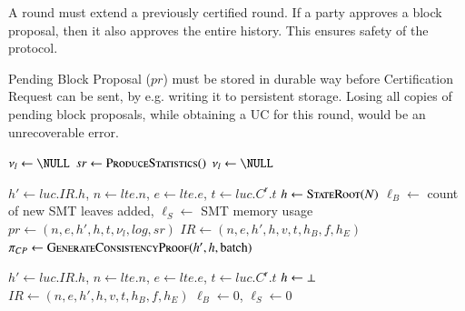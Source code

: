 A round must extend a previously certified round. If a party approves a block proposal, then it also approves the entire history. This ensures safety of the protocol.

Pending Block Proposal ($pr$) must be stored in durable way before Certification Request can be sent, by e.g. writing it to persistent storage. Losing all copies of pending block proposals, while obtaining a UC for this round, would be an unrecoverable error.

\begin{algorithm}
  \caption{Producing a Block Proposal}\label{alg:proposal}
  \begin{algorithmic}[0]
                      
        \State $\nu_l \gets \NULL$
        \State {}  
        \State $sr \gets \Call{ProduceStatistics}{\null}$
        \State {} 
        \State {}
      \EndIf
      \State $\nu_l \gets \NULL$          
    \EndEvent
  \end{algorithmic}
\end{algorithm}

\begin{algorithm}
  \caption{Producing a Certification Request}\label{alg:ucrequest}
  \begin{algorithmic}[0]
      \State $h' \gets luc.IR.h$, $n \gets lte.n$, $e \gets lte.e$, $t \gets luc.C^\mathsf{r}.t$
      \State $h \gets \Call{StateRoot}{N}$
      \State $\ell_B \gets$ count of new SMT leaves added, $\ell_S \gets$ SMT memory usage
      \State $pr \gets (n, e, h', h, t, \nu_l, log, sr)$  
        \State $IR \gets (n, e, h', h, v, t, h_B, f, h_E)$
        \State $\pi_{CP} \gets \Call{GenerateConsistencyProof}{h', h, \text{batch}}$ 
        \State {}
      \Else
        \State {}
        \State {}
      \EndIf
    \EndFunction

      
      \State $h' \gets luc.IR.h$, $n \gets lte.n$, $e \gets lte.e$, $t \gets luc.C^\mathsf{r}.t$
      \State $h \gets \bot$
      \State $IR \gets (n, e, h', h, v, t, h_B, f, h_E)$
      \State $\ell_B \gets 0$, $\ell_S \gets 0$ 
      \State {}  
    \EndFunction
  \end{algorithmic}
\end{algorithm}

